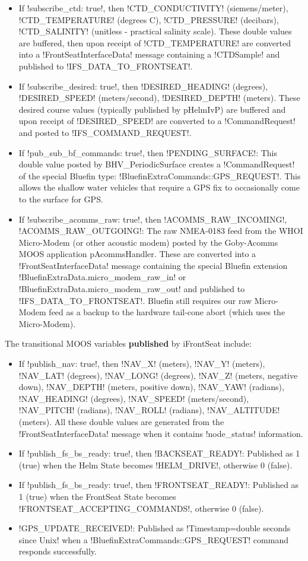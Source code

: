 \begin{itemize}
\item If !subscribe_ctd: true!, then !CTD_CONDUCTIVITY! (siemens/meter), !CTD_TEMPERATURE! (degrees C), !CTD_PRESSURE! (decibars), !CTD_SALINITY! (unitless - practical salinity scale). These double values are buffered, then upon receipt of !CTD_TEMPERATURE! are converted into a !FrontSeatInterfaceData! message containing a !CTDSample! and published to !IFS_DATA_TO_FRONTSEAT!.
\item If !subscribe_desired: true!, then !DESIRED_HEADING! (degrees), !DESIRED_SPEED! (meters/second), !DESIRED_DEPTH! (meters). These desired course values (typically published by pHelmIvP) are buffered and upon receipt of !DESIRED_SPEED! are converted to a !CommandRequest! and posted to !IFS_COMMAND_REQUEST!.
\item If !pub_sub_bf_commands: true!, then !PENDING_SURFACE!: This double value posted by BHV\_PeriodicSurface creates a !CommandRequest! of the special Bluefin type: !BluefinExtraCommands::GPS_REQUEST!. This allows the shallow water vehicles that require a GPS fix to occasionally come to the surface for GPS.
\item If !subscribe_acomms_raw: true!, then !ACOMMS_RAW_INCOMING!, !ACOMMS_RAW_OUTGOING!: The raw NMEA-0183 feed from the WHOI Micro-Modem (or other acoustic modem) posted by the Goby-Acomms MOOS application pAcommsHandler. These are converted into a !FrontSeatInterfaceData! message containing the special Bluefin extension !BluefinExtraData.micro_modem_raw_in! or !BluefinExtraData.micro_modem_raw_out! and published to !IFS_DATA_TO_FRONTSEAT!. Bluefin still requires our raw Micro-Modem feed as a backup to the hardware tail-cone abort (which uses the Micro-Modem). 
\end{itemize}

The transitional MOOS variables \textbf{published} by iFrontSeat include:

\begin{itemize}
\item If !publish_nav: true!, then !NAV_X! (meters), !NAV_Y! (meters), !NAV_LAT! (degrees), !NAV_LONG! (degrees), !NAV_Z! (meters, negative down), !NAV_DEPTH! (meters, positive down), !NAV_YAW! (radians), !NAV_HEADING! (degrees), !NAV_SPEED! (meters/second), !NAV_PITCH! (radians), !NAV_ROLL! (radians), !NAV_ALTITUDE! (meters). All these double values are generated from the !FrontSeatInterfaceData! message when it contains !node_status! information.
\item If !publish_fs_bs_ready: true!, then !BACKSEAT_READY!: Published as 1 (true) when the Helm State becomes !HELM_DRIVE!, otherwise 0 (false).
\item If !publish_fs_bs_ready: true!, then !FRONTSEAT_READY!: Published as 1 (true) when the FrontSeat State becomes !FRONTSEAT_ACCEPTING_COMMANDS!, otherwise 0 (false).
\item !GPS_UPDATE_RECEIVED!: Published as !Timestamp=double seconds since Unix! when a !BluefinExtraCommands::GPS_REQUEST! command responds successfully.
\end{itemize}

